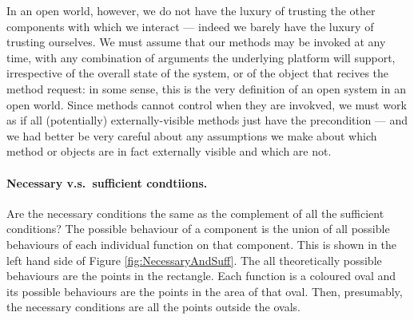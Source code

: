 In an open world, however, we do not have the luxury of trusting the
other components with which we interact --- indeed we barely have the
luxury of trusting ourselves.  We must assume that our methods may be
invoked at any time, with any combination of arguments the underlying
platform will support, irrespective of the overall state of the
system, or of the object that recives the method request: in some
sense, this is the very definition of an open system in an open world.
Since methods cannot control when they are invokved, we must work
as if all (potentially) externally-visible methods just have the precondition
 --- and we had better be very careful about any assumptions
we make about which method or objects are in fact externally visible
and which are not.  






\paragraph{Necessary v.s.\ sufficient condtiions.}

Are the necessary conditions the same as the complement of all the
sufficient conditions?  The possible behaviour of a component is the
union of all possible behaviours of each individual function on that
component.  This is shown in the left hand side of
Figure \ref{fig:NecessaryAndSuff}. The all theoretically possible
behaviours are the points in the rectangle.  Each function is a
coloured oval and its possible behaviours are the points in the area
of that oval.  Then, presumably, the necessary conditions are all the
points outside the ovals.

